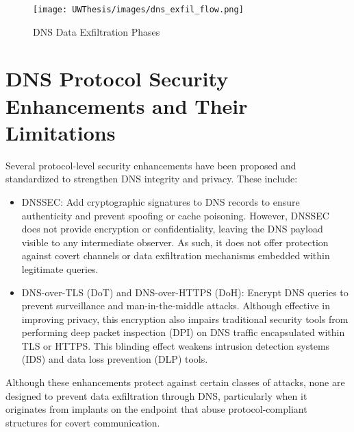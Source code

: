 \documentclass [11pt, proquest] {uwthesis}[2020/02/24]
\begin{document}
\label{sec:dns c2 flow}
\begin{figure}[h]
\texttt{[image: UWThesis/images/dns\_exfil\_flow.png]}
\caption{DNS Data Exfiltration Phases}
\end{figure}



\section{DNS Protocol Security Enhancements and Their Limitations}
Several protocol-level security enhancements have been proposed and standardized to strengthen DNS integrity and privacy. These include:
\begin{itemize}
    \item DNSSEC: Add cryptographic signatures to DNS records to ensure authenticity and prevent spoofing or cache poisoning. However, DNSSEC does not provide encryption or confidentiality, leaving the DNS payload visible to any intermediate observer. As such, it does not offer protection against covert channels or data exfiltration mechanisms embedded within legitimate queries.
    \item DNS-over-TLS (DoT) and DNS-over-HTTPS (DoH): Encrypt DNS queries to prevent surveillance and man-in-the-middle attacks. Although effective in improving privacy, this encryption also impairs traditional security tools from performing deep packet inspection (DPI) on DNS traffic encapsulated within TLS or HTTPS. This blinding effect weakens intrusion detection systems (IDS) and data loss prevention (DLP) tools.
\end{itemize}
Although these enhancements protect against certain classes of attacks, none are designed to prevent data exfiltration through DNS, particularly when it originates from implants on the endpoint that abuse protocol-compliant structures for covert communication.
\end{document}
